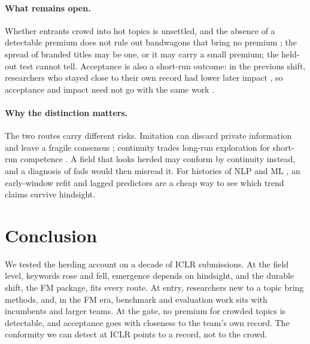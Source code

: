 \documentclass[11pt]{article}
\begin{document}
\paragraph{What remains open.}
Whether entrants crowd into hot topics is unsettled, and the absence of a detectable premium does not rule out
bandwagons that bring no premium \citep{abrahamson1993institutional}; the spread of branded titles may be one, or it
may carry a small premium; the held-out test cannot tell. Acceptance is also a short-run outcome: in the previous shift, researchers who stayed close to their own record had
lower later impact \citep{bao2025persistence}, so acceptance and impact need not go with the same work
\citep[cf.][]{march1991exploration,rzhetsky2015choosing}.

\paragraph{Why the distinction matters.}
The two routes carry different risks. Imitation can discard private information and leave a fragile consensus
\citep{bikhchandani1992theory,banerjee1992simple}; continuity trades long-run exploration for short-run competence
\citep{march1991exploration}. A field that looks herded may conform by continuity instead, and a diagnosis of fads
would then misread it. For histories of NLP and ML \citep{hall2008studying,anderson2012towards}, an early-window
refit and lagged predictors are a cheap way to see which trend claims survive hindsight.

\section{Conclusion}
\label{sec:conclusion}

We tested the herding account on a decade of ICLR submissions. At the field level, keywords rose and fell, emergence depends on hindsight, and the durable shift, the FM
package, fits every route. At entry, researchers new to a topic bring methods, and, in the FM era,
benchmark and evaluation work sits with incumbents and larger teams. At the gate, no premium for crowded topics is
detectable, and acceptance goes with
closeness to the team's own record. The conformity we can detect at ICLR points to a record, not to the crowd.

\end{document}
